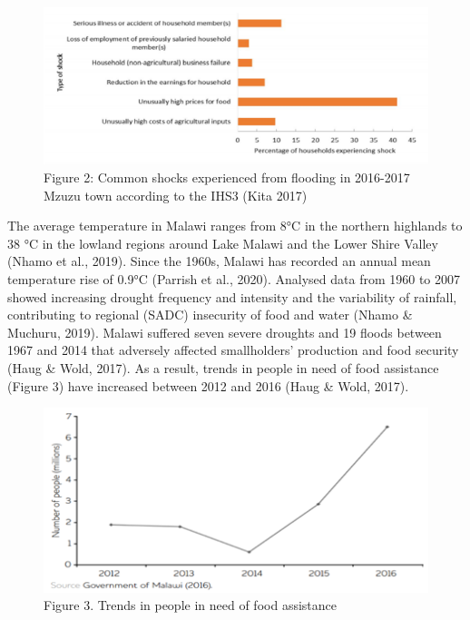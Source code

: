 \documentclass[
]{book}
\begin{document}
\begin{figure}
\centering
\includegraphics{images/mzuzu_shocks.png}
\caption{Figure 2: Common shocks experienced from flooding in 2016-2017 Mzuzu town according to the IHS3 (Kita 2017)}
\end{figure}

The average temperature in Malawi ranges from 8°C in the northern highlands to 38 °C in the lowland regions around Lake Malawi and the Lower Shire Valley (Nhamo et al., 2019). Since the 1960s, Malawi has recorded an annual mean temperature rise of 0.9°C (Parrish et al., 2020). Analysed data from 1960 to 2007 showed increasing drought frequency and intensity and the variability of rainfall, contributing to regional (SADC) insecurity of food and water (Nhamo \& Muchuru, 2019). Malawi suffered seven severe droughts and 19 floods between 1967 and 2014 that adversely affected smallholders' production and food security (Haug \& Wold, 2017). As a result, trends in people in need of food assistance (Figure 3) have increased between 2012 and 2016 (Haug \& Wold, 2017).

\begin{figure}
\centering
\includegraphics{images/food_assistance_trends.png}
\caption{Figure 3. Trends in people in need of food assistance}
\end{figure}
\end{document}

